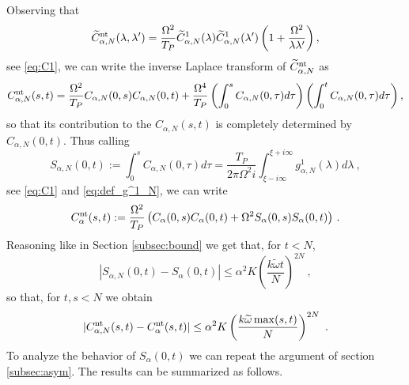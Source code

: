\documentclass[11pt]{article}
\numberwithin{equation}{section}
\numberwithin{theorem}{section}
\def\tilde#1{\widetilde{#1}}
\begin{document}
Observing that
\begin{equation*}
\tilde C^{\rm nt}_{\alpha,N}(\lambda,\lambda') = \frac{\Omega^2}{T_P}
\tilde C^1_{\alpha,N}(\lambda)\tilde C^1_{\alpha,N}(\lambda')
\left(1+\frac{\Omega^2}{\lambda\lambda'}\right),
\end{equation*}
see \eqref{eq:C1}, we can write the inverse Laplace transform of $\tilde C^{\rm nt}_{\alpha,N} $ as
\begin{equation}\label{eq:CNsplit}
C^{\rm nt}_{\alpha,N}(s,t)=\frac{\Omega^2}{T_P}C_{\alpha,N}(0,s)C_{\alpha,N}(0,t)
+\frac{\Omega^4}{T_P}\left(\int_0^s C_{\alpha,N}(0,\tau)d\tau\right)\left(\int_0^t
C_{\alpha,N}(0,\tau)d\tau\right) ,
\end{equation}
so that its contribution to the $C_{\alpha,N}(s,t)$ is completely determined by $C_{\alpha,N}(0,t)$. Thus calling
\[
S_{\alpha,N}(0,t):=\int_0^s C_{\alpha,N}(0,\tau)d\tau=\frac{T_P}{2\pi \Omega^2 i}\int_{\xi-i\infty}^{\xi+i\infty}
g^1_{\alpha,N}(\lambda)d\lambda\ ,
\]
see \eqref{eq:C1} and \eqref{eq:def_g^1_N}, we can write
\begin{equation*}
 C^{\rm nt}_\alpha(s,t):=\frac{\Omega^2}{T_P}\left(C_\alpha(0,s)C_\alpha(0,t)
+\Omega^2 S_\alpha(0,s) S_\alpha(0,t)\right)\, .
\end{equation*}
Reasoning like in Section \ref{subsec:bound} we get that, for $t<N$,
\begin{equation}\label{eq:N^NS}
|S_{\alpha,N}(0,t)-S_\alpha(0,t)|\leq 
\alpha^2 K\left(\frac{k\tilde\omega  t}N\right)^{2N}\ ,
\end{equation}
so that, for $t,s<N$ we obtain
\begin{equation}\label{eq:diff-nt}
|C^{\rm nt}_{\alpha,N}(s,t)-C^{\rm nt}_{\alpha}(s,t)|\leq \alpha^2 K\left(\frac{k\tilde\omega 
\max(s,t)}{N}\right)^{2N}\ .
\end{equation}
To analyze the behavior of $S_\alpha(0,t)$ we can repeat the argument of section \ref{subsec:asym}. The results can be
summarized as follows.
\end{document}
